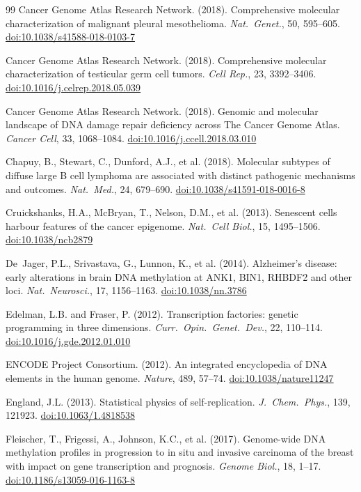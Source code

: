 \documentclass[12pt,a4paper]{article}
\newcommand{\doi}[1]{\href{https://doi.org/#1}{doi:#1}}
\begin{document}
\begin{thebibliography}{99}
Cancer Genome Atlas Research Network. (2018).
Comprehensive molecular characterization of malignant pleural mesothelioma.
\textit{Nat.\ Genet.}, 50, 595--605.
\doi{10.1038/s41588-018-0103-7}

Cancer Genome Atlas Research Network. (2018).
Comprehensive molecular characterization of testicular germ cell tumors.
\textit{Cell Rep.}, 23, 3392--3406.
\doi{10.1016/j.celrep.2018.05.039}

Cancer Genome Atlas Research Network. (2018).
Genomic and molecular landscape of DNA damage repair deficiency across The Cancer Genome Atlas.
\textit{Cancer Cell}, 33, 1068--1084.
\doi{10.1016/j.ccell.2018.03.010}

Chapuy, B., Stewart, C., Dunford, A.J., et al. (2018).
Molecular subtypes of diffuse large B cell lymphoma are associated with distinct pathogenic mechanisms and outcomes.
\textit{Nat.\ Med.}, 24, 679--690.
\doi{10.1038/s41591-018-0016-8}

Cruickshanks, H.A., McBryan, T., Nelson, D.M., et al. (2013).
Senescent cells harbour features of the cancer epigenome.
\textit{Nat.\ Cell Biol.}, 15, 1495--1506.
\doi{10.1038/ncb2879}

De~Jager, P.L., Srivastava, G., Lunnon, K., et al. (2014).
Alzheimer's disease: early alterations in brain DNA methylation at ANK1, BIN1, RHBDF2 and other loci.
\textit{Nat.\ Neurosci.}, 17, 1156--1163.
\doi{10.1038/nn.3786}

Edelman, L.B. and Fraser, P. (2012).
Transcription factories: genetic programming in three dimensions.
\textit{Curr.\ Opin.\ Genet.\ Dev.}, 22, 110--114.
\doi{10.1016/j.gde.2012.01.010}

ENCODE Project Consortium. (2012).
An integrated encyclopedia of DNA elements in the human genome.
\textit{Nature}, 489, 57--74.
\doi{10.1038/nature11247}

England, J.L. (2013).
Statistical physics of self-replication.
\textit{J.\ Chem.\ Phys.}, 139, 121923.
\doi{10.1063/1.4818538}

Fleischer, T., Frigessi, A., Johnson, K.C., et al. (2017).
Genome-wide DNA methylation profiles in progression to in situ and invasive carcinoma of the breast with impact on gene transcription and prognosis.
\textit{Genome Biol.}, 18, 1--17.
\doi{10.1186/s13059-016-1163-8}


\end{thebibliography}
\end{document}
